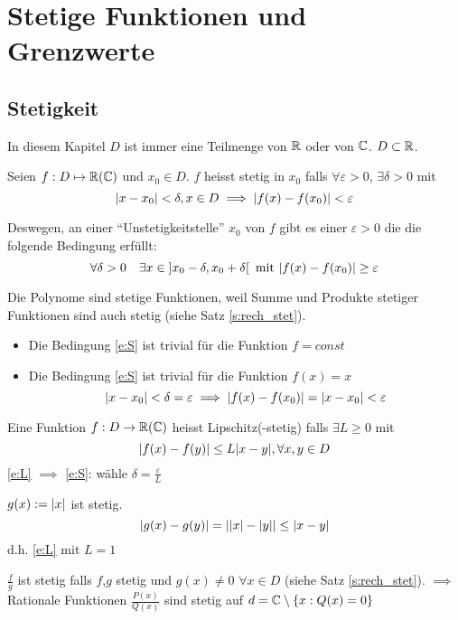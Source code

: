 \section{Stetige Funktionen und Grenzwerte}
\subsection{Stetigkeit}
In diesem Kapitel $D$ ist immer eine Teilmenge von $\mathbb{R}$ oder 
von $\mathbb{C}$. $D\subset\mathbb{R}$.
\begin{Def}
Seien $f:D\mapsto \mathbb{R}(\mathbb{C})$ und $x_0\in D$. $f$ heisst stetig in $x_0$ falls $\forall \varepsilon >0$, $\exists\delta>0$ mit
\begin{equation}\label{e:S}
\mathopen| x-x_0 \mathclose|<\delta, x\in D\implies \mathopen| f(x)-f(x_0) \mathclose|<\varepsilon
 \end{equation}
\end{Def}
Deswegen, an einer ``Unstetigkeitstelle'' $x_0$ von $f$ gibt es einer
$\varepsilon > 0$ die die folgende Bedingung erf\"ullt:
\[\forall\delta>0\quad 
\exists x\in\left] x_0-\delta,x_0+\delta  \right[\text{ mit } 
\mathopen| f(x)-f(x_0) \mathclose|\geq \varepsilon\]
\begin{Bsp}
  Die Polynome sind stetige Funktionen, weil
 Summe und Produkte stetiger Funktionen sind auch stetig (siehe 
Satz \ref{s:rech_stet}).
\end{Bsp}
\begin{Bem}
  \begin{itemize}
    \item Die Bedingung \eqref{e:S} ist trivial für die Funktion $f=const$
    \item Die Bedingung \eqref{e:S} ist trivial für die Funktion $f(x)=x$
      \[\mathopen| x-x_0 \mathclose|<\delta=\varepsilon\implies\mathopen| f(x)-f(x_0) \mathclose|=\mathopen| x-x_0 \mathclose|<\varepsilon\]
  \end{itemize}
\end{Bem}
\begin{Def}
  Eine Funktion $f:D\to \mathbb{R}(\mathbb{C})$ heisst Lipschitz(-stetig) falls $\exists L\geq 0$ mit
  \begin{equation}\label{e:L}
\mathopen| f(x)-f(y) \mathclose|\leq L\mathopen| x-y \mathclose|, \forall x,y\in D
\end{equation}
\eqref{e:L} $\implies$ \eqref{e:S}: wähle $\delta=\frac{\varepsilon}{L}$
\end{Def}
\begin{Kor}
  $g(x):=\mathopen| x \mathclose|$ ist stetig.
  \[\mathopen| g(x)-g(y) \mathclose|=\mathopen| \mathopen| x \mathclose|-\mathopen| y \mathclose| \mathclose|\leq\mathopen| x-y \mathclose|\]
  d.h. \eqref{e:L} mit $L=1$
\end{Kor}
\begin{Bsp}
$\frac{f}{g}$ ist stetig falls $f$,$g$ stetig und $g(x)\neq 0$ $\forall x\in D$
(siehe Satz \ref{s:rech_stet}). $\implies$ Rationale Funktionen $\frac{P(x)}{Q(x)}$ sind stetig auf $d=\mathbb{C}\setminus\left\{ x:Q(x)=0 \right\}$
\end{Bsp}
